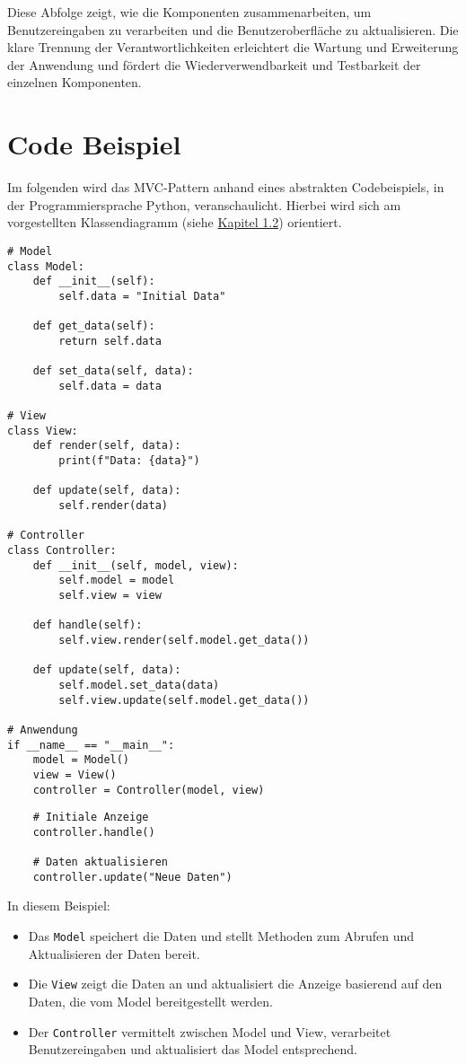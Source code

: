 Diese Abfolge zeigt, wie die Komponenten zusammenarbeiten, um Benutzereingaben zu verarbeiten und die Benutzeroberfläche zu aktualisieren. Die klare Trennung der Verantwortlichkeiten erleichtert die Wartung und Erweiterung der Anwendung und fördert die Wiederverwendbarkeit und Testbarkeit der einzelnen Komponenten.

\section{Code Beispiel}

Im folgenden wird das \ac{MVC}-Pattern anhand eines abstrakten Codebeispiels, in der Programmiersprache Python, veranschaulicht. Hierbei wird sich am vorgestellten Klassendiagramm (siehe \hyperref[sec:klassendiagramm]{Kapitel 1.2}) orientiert.

\begin{verbatim}
# Model
class Model:
    def __init__(self):
        self.data = "Initial Data"

    def get_data(self):
        return self.data

    def set_data(self, data):
        self.data = data

# View
class View:
    def render(self, data):
        print(f"Data: {data}")

    def update(self, data):
        self.render(data)

# Controller
class Controller:
    def __init__(self, model, view):
        self.model = model
        self.view = view

    def handle(self):
        self.view.render(self.model.get_data())

    def update(self, data):
        self.model.set_data(data)
        self.view.update(self.model.get_data())

# Anwendung
if __name__ == "__main__":
    model = Model()
    view = View()
    controller = Controller(model, view)
\end{verbatim}
\newpage
\begin{verbatim}
    # Initiale Anzeige
    controller.handle()

    # Daten aktualisieren
    controller.update("Neue Daten")
\end{verbatim}

In diesem Beispiel:
\begin{itemize}
    \item Das \texttt{Model} speichert die Daten und stellt Methoden zum Abrufen und Aktualisieren der Daten bereit.
    \item Die \texttt{View} zeigt die Daten an und aktualisiert die Anzeige basierend auf den Daten, die vom Model bereitgestellt werden.
    \item Der \texttt{Controller} vermittelt zwischen Model und View, verarbeitet Benutzereingaben und aktualisiert das Model entsprechend.
\end{itemize}